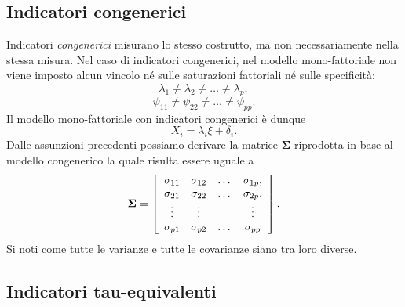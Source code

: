 \subsection{Indicatori congenerici}

Indicatori  \textit{congenerici} misurano lo stesso costrutto, ma
  non necessariamente nella stessa misura. 
Nel caso di indicatori congenerici, nel modello mono-fattoriale non
viene imposto alcun vincolo né sulle saturazioni fattoriali né sulle specificità:
$$\lambda_1\neq \lambda_2 \neq \dots\neq \lambda_p,$$
$$\psi_{11}\neq \psi_{22} \neq \dots\neq \psi_{pp}.$$
   Il modello mono-fattoriale con indicatori congenerici è dunque 
\begin{equation}
X_i = \lambda_i \xi + \delta_i.
\label{eq:mod_tau_eq}
\end{equation}
Dalle assunzioni precedenti possiamo derivare la matrice $\boldsymbol{\Sigma}$ riprodotta in base al modello congenerico la quale risulta essere uguale a
  \begin{equation}
    \boldsymbol{\Sigma}=\left[
      \begin{array}{ c c c c }
        \sigma_{11} & \sigma_{12} & \dots & \sigma_{1p}, \\
        \sigma_{21} & \sigma_{22} & \dots & \sigma_{2p}. \\
        \vdots & \vdots & & \vdots\\
        \sigma_{p1} & \sigma_{p2} & \dots & \sigma_{pp} 
      \end{array} 
    \right].
  \end{equation}
 Si noti come tutte le varianze e tutte le covarianze siano tra loro diverse.

\subsection{Indicatori tau-equivalenti}

